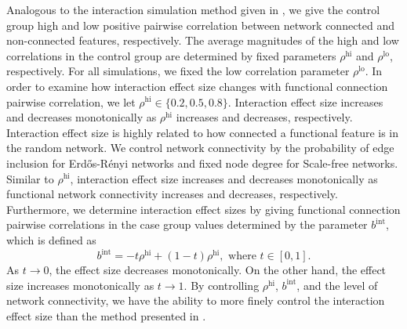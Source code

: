 \documentclass[10pt,letterpaper]{article}\usepackage[]{graphicx}\usepackage[]{color}
\begin{document}
Analogous to the interaction simulation method given in \cite{lareau15}, we give the control group high and low positive pairwise correlation between network connected and non-connected features, respectively. The average magnitudes of the high and low correlations in the control group are determined by fixed parameters $\rho^\text{hi}$ and $\rho^\text{lo}$, respectively. For all simulations, we fixed the low correlation parameter $\rho^\text{lo}$. In order to examine how interaction effect size changes with functional connection pairwise correlation, we let $\rho^\text{hi} \in \{0.2, 0.5, 0.8\}$. Interaction effect size increases and decreases monotonically as $\rho^\text{hi}$ increases and decreases, respectively. Interaction effect size is highly related to how connected a functional feature is in the random network. We control network connectivity by the probability of edge inclusion for Erd\H{o}s-R\'{e}nyi networks and fixed node degree for Scale-free networks. Similar to $\rho^\text{hi}$, interaction effect size increases and decreases monotonically as functional network connectivity increases and decreases, respectively. Furthermore, we determine interaction effect sizes by giving functional connection pairwise correlations in the case group values determined by the parameter $b^\text{int}$, which is defined as
\begin{equation}\label{eq:b_int}
b^\text{int} = - t \rho^\text{hi} + (1 - t) \rho^\text{hi}, \text{ where } t \in [0,1].
\end{equation}
As $t \to 0$, the effect size decreases monotonically. On the other hand, the effect size increases monotonically as $t \to 1$. By controlling $\rho^\text{hi}$, $b^\text{int}$, and the level of network connectivity, we have the ability to more finely control the interaction effect size than the method presented in \cite{lareau15}. 
\end{document}
